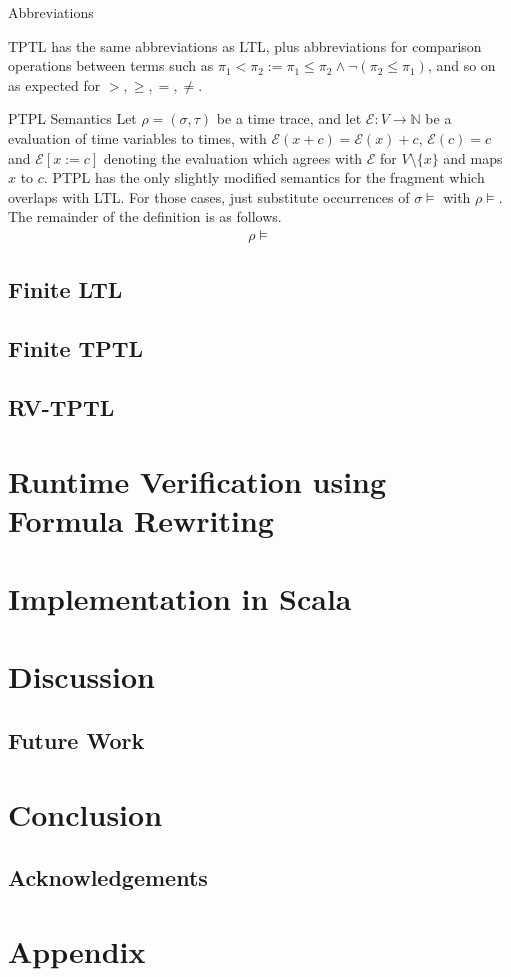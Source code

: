 \documentclass[a4paper]{article}
\begin{document}
\begin{notn}{Abbreviations}

  TPTL has the same abbreviations as LTL, plus abbreviations for comparison operations between terms such as $\pi_1 < \pi_2 := \pi_1 \leq \pi_2 \land \neg(\pi_2 \leq \pi_1)$, and so on as expected for $>,\geq,=,\neq$.
\end{notn}

\begin{defn}{PTPL Semantics}
  \newcommand{\eval}{\mathcal{E}}
  Let $\rho = (\sigma,\tau)$ be a time trace, and let $\eval:V\to\mathbb{N}$ be a evaluation of time variables to times, with $\eval(x + c) = \eval(x) + c$, $\eval(c) = c$ and $\eval[x:=c]$ denoting the evaluation which agrees with $\eval$ for $V\setminus\{x\}$ and maps $x$ to $c$.
  PTPL has the only slightly modified semantics for the fragment which overlaps with LTL. For those cases, just substitute occurrences of $\sigma\vDash$ with $\rho\vDash$. The remainder of the definition is as follows.
  \begin{align*}
    \rho\vDash
  \end{align*}
\end{defn}


\subsection{Finite LTL}
\subsection{Finite TPTL}
\subsection{RV-TPTL}
\section{Runtime Verification using Formula Rewriting}
\section{Implementation in Scala}

\section{Discussion}
\subsection{Future Work}
\section{Conclusion}
\subsection{Acknowledgements}

\nocite{*}
\printbibliography{}
\newpage
\section{Appendix}\label{appendix}
\end{document}
